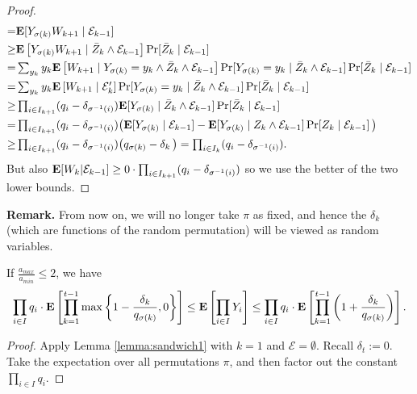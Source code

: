 \begin{proof}
\begin{align*}
=&\text{\bf E}[Y_{\sigma(k)} W_{k+1}\mid\mathcal{E}_{k-1}] 
\\ \ge& \text{\bf E}\left[Y_{\sigma(k)} W_{k+1}\mid \bar Z_k\land\mathcal{E}_{k-1}\right] 
	\Pr[\bar Z_k\mid\mathcal{E}_{k-1}] 
\\ =& \textstyle\sum_{y_k} y_k \text{\bf E}\left[W_{k+1}\mid Y_{\sigma(k)}=y_k\land\bar Z_k\land\mathcal{E}_{k-1}\right]
	\Pr[Y_{\sigma(k)}=y_k\mid \bar Z_k\land \mathcal{E}_{k-1}] 
	\Pr[\bar Z_k\mid\mathcal{E}_{k-1}] 
\\ =& \textstyle\sum_{y_k} y_k \text{\bf E}\left[W_{k+1}\mid \mathcal{E}_{k}'\right] 
	\Pr[Y_{\sigma(k)}=y_k\mid \bar Z_k\land\mathcal{E}_{k-1}]
	\Pr[\bar Z_k\mid\mathcal{E}_{k-1}] 
\\ \ge& \textstyle\prod_{i\in I_{k+1}}(q_i-\delta_{\sigma^{-1}(i)})
	\text{\bf E}[Y_{\sigma(k)} \mid \bar Z_k\land\mathcal{E}_{k-1}]\Pr[\bar Z_k\mid\mathcal{E}_{k-1}] 
\\ =& \textstyle\prod_{i\in I_{k+1}}(q_i-\delta_{\sigma^{-1}(i)})
	\big(\text{\bf E}[Y_{\sigma(k)}\mid\mathcal{E}_{k-1}]-\text{\bf E}[Y_{\sigma(k)}\mid  Z_k\land\mathcal{E}_{k-1}]\Pr[ Z_k\mid\mathcal{E}_{k-1}] \,\big)
\\ \ge& \textstyle\prod_{i\in I_{k+1}}(q_i-\delta_{\sigma^{-1}(i)})
	\big(q_{\sigma(k)}-\delta_k\,\big) 
=\textstyle\prod_{i\in I_{k}}(q_i-\delta_{\sigma^{-1}(i)}).
\end{align*}
But also $\text{\bf E}[W_{k}|\mathcal{E}_{k-1}]\ge 0\cdot\prod_{i\in I_{k+1}}(q_i-\delta_{\sigma^{-1}(i)})$ so we use the better of the two lower bounds.
\end{proof} 

\smallskip \noindent \textbf{Remark.} From now on, we will no longer take $\pi$ as fixed, and hence the $\delta_k$ (which are functions of the random permutation) will be viewed as random variables.

\smallskip
\begin{lemma} \label{lemma:sandwich}
If $\frac{a_{max}}{a_{min}}\le2$, we have 
\[ \prod_{i\in I} q_i \cdot\text{\bf E}\left[\prod_{k=1}^{t-1} \max\left\{1 - \frac{\delta_k}{q_{\sigma(k)}},0\right\}\right]
\le \text{\bf E}\left[\prod_{i\in I} Y_i \right]
\le \prod_{i\in I} q_i \cdot\text{\bf E}\left[\prod_{k=1}^{t-1} \left(1 + \frac{\delta_k}{q_{\sigma(k)}}\right)\right]
.\] 
\end{lemma}
\begin{proof}
Apply Lemma \ref{lemma:sandwich1} with $k=1$ and $\mathcal{E}=\emptyset$. Recall $\delta_t:=0$. Take the expectation over all permutations $\pi$, and then factor out the constant $\prod_{i\in I} q_i$.
\end{proof}
